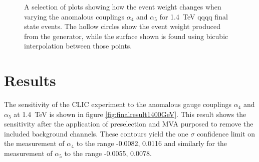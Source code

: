 \begin{figure}[h!]
\caption[A selection of plots showing how the event weight changes when varying the anomalous couplings $\alpha_{4}$ and $\alpha_{5}$ for 1.4~TeV \nu{\nu}qqqq final state events.  The hollow circles show the event weight produced from the generator, while the surface shown is found using bicubic interpolation between those points.]{A selection of plots showing how the event weight changes when varying the anomalous couplings $\alpha_{4}$ and $\alpha_{5}$ for 1.4~TeV \nu{\nu}qqqq final state events.  The hollow circles show the event weight produced from the generator, while the surface shown is found using bicubic interpolation between those points.}
\label{fig:eventweights1400interpolated}
\end{figure}


\section{Results}
The sensitivity of the CLIC experiment to the anomalous gauge couplings $\alpha_{4}$ and $\alpha_{5}$ at 1.4~TeV is shown in figure \ref{fig:finalresult1400GeV}.  This result shows the sensitivity after the application of preselection and MVA purposed to remove the included background channels.  These contours yield the one $\sigma$ confidence limit on the measurement of $\alpha_{4}$ to the range -0.0082, 0.0116 and similarly for the measurement of $\alpha_{5}$ to the range -0.0055, 0.0078.


